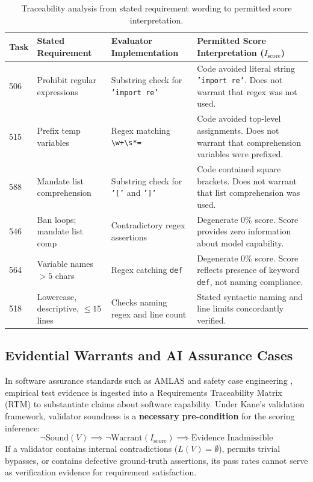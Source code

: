 \documentclass[runningheads]{llncs}
\begin{document}
\begin{table}[t]
\caption{Traceability analysis from stated requirement wording to permitted score interpretation.}
\label{tab:scoring_warrant}
\centering
\scriptsize
\setlength{\tabcolsep}{4pt}
\begin{tabularx}{\textwidth}{@{}l>{\raggedright\arraybackslash}p{3.2cm}>{\raggedright\arraybackslash}p{3.5cm}>{\raggedright\arraybackslash}X@{}}
\toprule
\textbf{Task} & \textbf{Stated Requirement} & \textbf{Evaluator Implementation} & \textbf{Permitted Score Interpretation ($I_{\text{score}}$)} \\
\midrule
506 & Prohibit regular expressions & Substring check for \texttt{'import re'} & Code avoided literal string \texttt{'import re'}. Does not warrant that regex was not used. \\
515 & Prefix temp variables & Regex matching \texttt{\textbackslash w+\textbackslash s*=} & Code avoided top-level assignments. Does not warrant that comprehension variables were prefixed. \\
588 & Mandate list comprehension & Substring check for \texttt{'['} and \texttt{']'} & Code contained square brackets. Does not warrant that list comprehension was used. \\
546 & Ban loops; mandate list comp & Contradictory regex assertions & Degenerate 0\% score. Score provides zero information about model capability. \\
564 & Variable names $> 5$ chars & Regex catching \texttt{def} & Degenerate 0\% score. Score reflects presence of keyword \texttt{def}, not naming compliance. \\
518 & Lowercase, descriptive, $\le 15$ lines & Checks naming regex and line count & Stated syntactic naming and line limits concordantly verified. \\
\bottomrule
\end{tabularx}
\end{table}

\subsection{Evidential Warrants and AI Assurance Cases}
In software assurance standards such as AMLAS \cite{hawkins_amlas_2021} and safety case engineering \cite{lawford_safety_case_impact_2017}, empirical test evidence is ingested into a Requirements Traceability Matrix (RTM) to substantiate claims about software capability. Under Kane's validation framework, validator soundness is a \textbf{necessary pre-condition} for the scoring inference:
\begin{equation}
\label{eq:necessary_condition}
\neg\text{Sound}(V) \implies \neg\text{Warrant}(I_{\text{score}}) \implies \text{Evidence Inadmissible}
\end{equation}
If a validator contains internal contradictions ($L(V)=\emptyset$), permits trivial bypasses, or contains defective ground-truth assertions, its pass rates cannot serve as verification evidence for requirement satisfaction.
\end{document}
